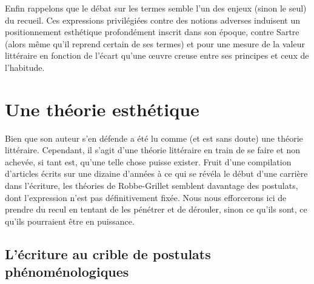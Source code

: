 \documentclass[12pt, a4paper]{article}
\begin{document}


Enfin rappelons que le débat sur les termes semble l'un des enjeux (sinon le seul) du recueil. Ces expressions privilégiées contre des notions adverses induisent un positionnement esthétique profondément inscrit dans son époque, contre Sartre (alors même qu'il reprend certain de ses termes) et pour une mesure de la valeur littéraire en fonction de l'écart qu'une œuvre creuse entre ses principes et ceux de l'habitude.


\newpage

\section{Une théorie esthétique}

Bien que son auteur s'en défende \punr{} a été lu comme (et est sans doute) une théorie littéraire. Cependant, il s'agit d'une théorie littéraire en train de se faire et non achevée, si tant est, qu'une telle chose puisse exister. Fruit d'une compilation d'articles écrits sur une dizaine d'années à ce qui se révéla le début d'une carrière dans l'écriture, les théories de Robbe-Grillet semblent davantage des postulats, dont l'expression n'est pas définitivement fixée. Nous nous efforcerons ici de prendre du recul en tentant de les pénétrer et de dérouler, sinon ce qu'ils sont, ce qu'ils pourraient être en puissance.

\subsection{L'écriture au crible de postulats phénoménologiques}
\label{3phéno}
\end{document}
